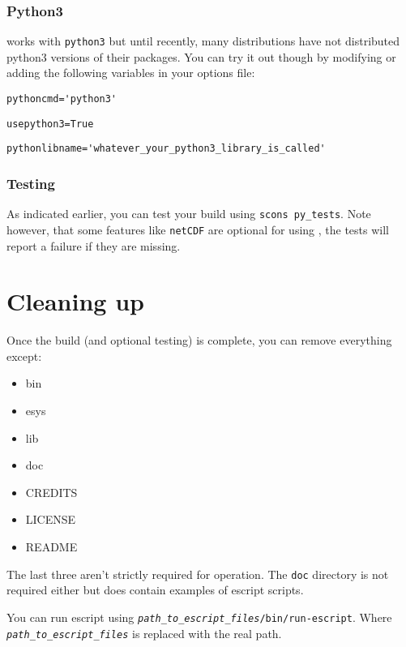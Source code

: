 \subsubsection{Python3}
\escript works with \texttt{python3} but until recently, many distributions have not distributed python3 versions of their packages.
You can try it out though by modifying or adding the following variables in your options file:

\begin{verbatim}
pythoncmd='python3'
\end{verbatim}

\begin{verbatim}
usepython3=True
\end{verbatim}

\begin{verbatim}
pythonlibname='whatever_your_python3_library_is_called'
\end{verbatim}




\subsubsection{Testing}
As indicated earlier, you can test your build using \texttt{scons py_tests}.
Note however, that some features like \texttt{netCDF} are optional for using \escript, the tests will report a failure if
they are missing.

\section{Cleaning up}
\label{sec:cleanup}

Once the build (and optional testing) is complete, you can remove everything except:
\begin{itemize}
 \item bin
 \item esys
 \item lib
 \item doc
 \item CREDITS
 \item LICENSE
 \item README
\end{itemize}
The last three aren't strictly required for operation.
The \texttt{doc} directory is not required either but does contain examples of escript scripts.

You can run escript using \texttt{\textit{path_to_escript_files}/bin/run-escript}.
Where \texttt{\textit{path_to_escript_files}} is replaced with the real path.

